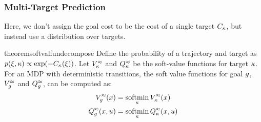 \subsubsection{Multi-Target Prediction}
\label{sec:framework_multigarget_prediction}
Here, we don't assign the goal cost to be the cost of a single target $C_{\kappa}$, but instead use a distribution over targets.%
\begin{restatable}{theorem}{softvalfundecompose}
  \label{thm:mingoal_pred}
  Define the probability of a trajectory and target as $p(\xi, \kappa) \propto \exp(-C_{\kappa}(\xi))$. Let $V^{\approx}_{\kappa}$ and $Q^{\approx}_{\kappa}$ be the soft-value functions for target $\kappa$. For an MDP with deterministic transitions, the soft value functions for goal $g$, $V^{\approx}_g$ and $Q^{\approx}_g$, can be computed as:
\begin{align*}
  V^{\approx}_g(x) &= \operatorname*{\text{soft}\!\min}_\kappa V^{\approx}_{\kappa}(x)\\
  Q^{\approx}_g(x, u) &= \operatorname*{\text{soft}\!\min}_\kappa Q^{\approx}_{\kappa}(x, u)
\end{align*}
\end{restatable}

%
%
%

